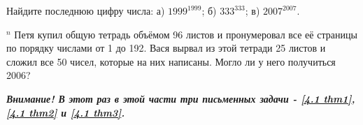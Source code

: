 \begin{thm}
    Найдите последнюю цифру числа: а) $1999^{1999}$; б) $333^{333}$; в) $2007^{2007}$.
\end{thm}

\begin{thm}$^n$ \label{4.1 thm3}
    Петя купил общую тетрадь объёмом 96 листов и пронумеровал все её страницы по порядку числами от 1 до 192. Вася вырвал из этой тетради 25 листов и сложил все 50 чисел, которые на них написаны. Могло ли у него получиться 2006?
\end{thm}

\textbf{\textit{Внимание! В этот раз в этой части три письменных задачи - \ref{4.1 thm1}, \ref{4.1 thm2} и \ref{4.1 thm3}.}}